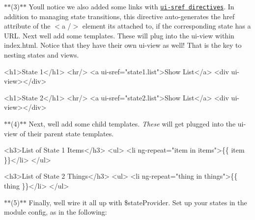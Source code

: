 $\ast$$\ast$(3)$\ast$$\ast$ You\textquotesingle{}ll notice we also added some links with \href{https://github.com/angular-ui/ui-router/wiki/Quick-Reference#ui-sref}{\tt {\ttfamily ui-\/sref} directives}. In addition to managing state transitions, this directive auto-\/generates the {\ttfamily href} attribute of the {\ttfamily $<$a /$>$} element it\textquotesingle{}s attached to, if the corresponding state has a U\+RL. Next we\textquotesingle{}ll add some templates. These will plug into the {\ttfamily ui-\/view} within {\ttfamily index.\+html}. Notice that they have their own {\ttfamily ui-\/view} as well! That is the key to nesting states and views.

\begin{quote}


\end{quote}

\begin{DoxyCode}
<h1>State 1</h1>
<hr/>
<a ui-sref="state1.list">Show List</a>
<div ui-view></div>
\end{DoxyCode}
 
\begin{DoxyCode}
<h1>State 2</h1>
<hr/>
<a ui-sref="state2.list">Show List</a>
<div ui-view></div>
\end{DoxyCode}


$\ast$$\ast$(4)$\ast$$\ast$ Next, we\textquotesingle{}ll add some child templates. {\itshape These} will get plugged into the {\ttfamily ui-\/view} of their parent state templates.

\begin{quote}


\end{quote}

\begin{DoxyCode}
<h3>List of State 1 Items</h3>
<ul>
  <li ng-repeat="item in items">\{\{ item \}\}</li>
</ul>
\end{DoxyCode}


\begin{quote}


\end{quote}

\begin{DoxyCode}
<h3>List of State 2 Things</h3>
<ul>
  <li ng-repeat="thing in things">\{\{ thing \}\}</li>
</ul>
\end{DoxyCode}


$\ast$$\ast$(5)$\ast$$\ast$ Finally, we\textquotesingle{}ll wire it all up with {\ttfamily \$state\+Provider}. Set up your states in the module config, as in the following\+:

